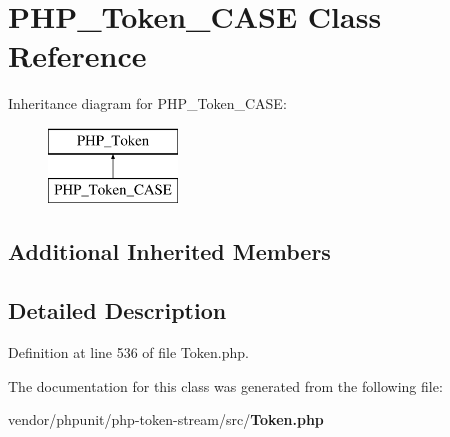 \section{P\+H\+P\+\_\+\+Token\+\_\+\+C\+A\+S\+E Class Reference}
\label{class_p_h_p___token___c_a_s_e}
Inheritance diagram for P\+H\+P\+\_\+\+Token\+\_\+\+C\+A\+S\+E\+:\begin{figure}[H]
\begin{center}
\leavevmode
\includegraphics[height=2.000000cm]{class_p_h_p___token___c_a_s_e}
\end{center}
\end{figure}
\subsection*{Additional Inherited Members}


\subsection{Detailed Description}


Definition at line 536 of file Token.\+php.



The documentation for this class was generated from the following file\+:\begin{DoxyCompactItemize}
\item 
vendor/phpunit/php-\/token-\/stream/src/{\bf Token.\+php}\end{DoxyCompactItemize}
